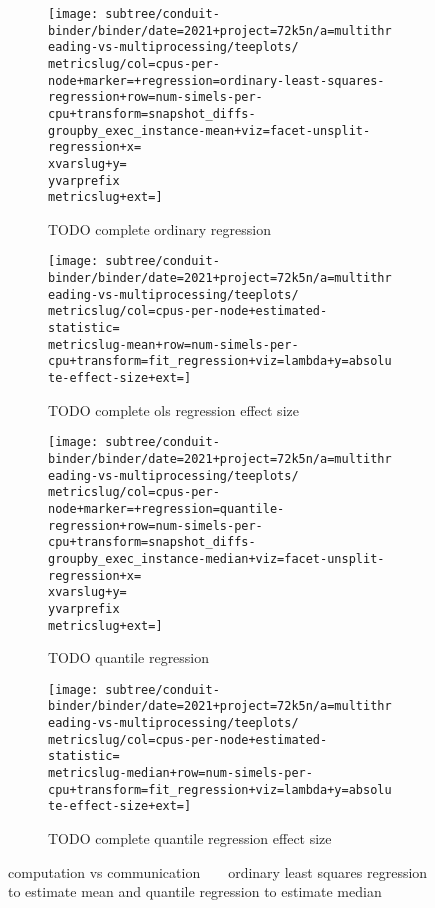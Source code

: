 \begin{figure*}
  \centering

  \begin{subfigure}[b]{0.5\textwidth}
    \centering
    \texttt{[image: subtree/conduit-binder/binder/date=2021+project=72k5n/a=multithreading-vs-multiprocessing/teeplots/\\metricslug/col=cpus-per-node+marker=+regression=ordinary-least-squares-regression+row=num-simels-per-cpu+transform=snapshot\_diffs-groupby\_exec\_instance-mean+viz=facet-unsplit-regression+x=\\xvarslug+y=\\yvarprefix\\metricslug+ext=]}
    \caption{TODO complete ordinary regression}
    \label{fig:multithreading-vs-multiprocessing-regression-ols-\metricslug-complete-regression}
  \end{subfigure}%
  \begin{subfigure}[b]{0.5\textwidth}
    \centering
    \texttt{[image: subtree/conduit-binder/binder/date=2021+project=72k5n/a=multithreading-vs-multiprocessing/teeplots/\\metricslug/col=cpus-per-node+estimated-statistic=\\metricslug-mean+row=num-simels-per-cpu+transform=fit\_regression+viz=lambda+y=absolute-effect-size+ext=]}
    \caption{TODO complete ols regression effect size}
    \label{fig:multithreading-vs-multiprocessing-regression-ols-\metricslug-complete-effect-size}
  \end{subfigure}

  \begin{subfigure}[b]{0.5\textwidth}
    \centering
    \texttt{[image: subtree/conduit-binder/binder/date=2021+project=72k5n/a=multithreading-vs-multiprocessing/teeplots/\\metricslug/col=cpus-per-node+marker=+regression=quantile-regression+row=num-simels-per-cpu+transform=snapshot\_diffs-groupby\_exec\_instance-median+viz=facet-unsplit-regression+x=\\xvarslug+y=\\yvarprefix\\metricslug+ext=]}
    \caption{TODO quantile regression}
    \label{fig:multithreading-vs-multiprocessing-regression-quantile-\metricslug-complete-regression}
  \end{subfigure}%
  \begin{subfigure}[b]{0.5\textwidth}
    \centering
    \texttt{[image: subtree/conduit-binder/binder/date=2021+project=72k5n/a=multithreading-vs-multiprocessing/teeplots/\\metricslug/col=cpus-per-node+estimated-statistic=\\metricslug-median+row=num-simels-per-cpu+transform=fit\_regression+viz=lambda+y=absolute-effect-size+ext=]}
    \caption{TODO complete quantile regression effect size}
    \label{fig:multithreading-vs-multiprocessing-regression-quantile-\metricslug-complete-effect-size}
  \end{subfigure}

  \caption{computation vs communication ~ \metric ~ ordinary least squares regression to estimate mean and quantile regression to estimate median}
  \label{fig:multithreading-vs-multiprocessing-regression-\metricslug}
\end{figure*}
